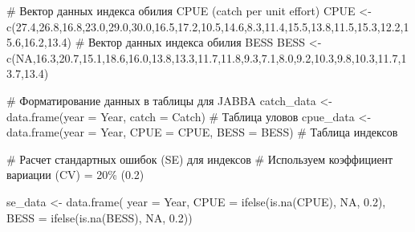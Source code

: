 \documentclass[
  letterpaper,
  DIV=11,
  numbers=noendperiod]{scrreprt}
\newenvironment{Shaded}{\begin{snugshade}}{\end{snugshade}}
\newcommand{\AttributeTok}[1]{\textcolor[rgb]{0.40,0.45,0.13}{#1}}
\newcommand{\CommentTok}[1]{\textcolor[rgb]{0.37,0.37,0.37}{#1}}
\newcommand{\ConstantTok}[1]{\textcolor[rgb]{0.56,0.35,0.01}{#1}}
\newcommand{\FloatTok}[1]{\textcolor[rgb]{0.68,0.00,0.00}{#1}}
\newcommand{\FunctionTok}[1]{\textcolor[rgb]{0.28,0.35,0.67}{#1}}
\newcommand{\NormalTok}[1]{\textcolor[rgb]{0.00,0.23,0.31}{#1}}
\newcommand{\OtherTok}[1]{\textcolor[rgb]{0.00,0.23,0.31}{#1}}
\begin{document}
\begin{Shaded}
\begin{Highlighting}[]
\CommentTok{\# Вектор данных индекса обилия CPUE (catch per unit effort)}
\NormalTok{CPUE }\OtherTok{\textless{}{-}} \FunctionTok{c}\NormalTok{(}\FloatTok{27.4}\NormalTok{,}\FloatTok{26.8}\NormalTok{,}\FloatTok{16.8}\NormalTok{,}\FloatTok{23.0}\NormalTok{,}\FloatTok{29.0}\NormalTok{,}\FloatTok{30.0}\NormalTok{,}\FloatTok{16.5}\NormalTok{,}\FloatTok{17.2}\NormalTok{,}\FloatTok{10.5}\NormalTok{,}\FloatTok{14.6}\NormalTok{,}\FloatTok{8.3}\NormalTok{,}\FloatTok{11.4}\NormalTok{,}\FloatTok{15.5}\NormalTok{,}\FloatTok{13.8}\NormalTok{,}\FloatTok{11.5}\NormalTok{,}\FloatTok{15.3}\NormalTok{,}\FloatTok{12.2}\NormalTok{,}\FloatTok{15.6}\NormalTok{,}\FloatTok{16.2}\NormalTok{,}\FloatTok{13.4}\NormalTok{)}
\CommentTok{\# Вектор данных индекса обилия BESS}
\NormalTok{BESS }\OtherTok{\textless{}{-}} \FunctionTok{c}\NormalTok{(}\ConstantTok{NA}\NormalTok{,}\FloatTok{16.3}\NormalTok{,}\FloatTok{20.7}\NormalTok{,}\FloatTok{15.1}\NormalTok{,}\FloatTok{18.6}\NormalTok{,}\FloatTok{16.0}\NormalTok{,}\FloatTok{13.8}\NormalTok{,}\FloatTok{13.3}\NormalTok{,}\FloatTok{11.7}\NormalTok{,}\FloatTok{11.8}\NormalTok{,}\FloatTok{9.3}\NormalTok{,}\FloatTok{7.1}\NormalTok{,}\FloatTok{8.0}\NormalTok{,}\FloatTok{9.2}\NormalTok{,}\FloatTok{10.3}\NormalTok{,}\FloatTok{9.8}\NormalTok{,}\FloatTok{10.3}\NormalTok{,}\FloatTok{11.7}\NormalTok{,}\FloatTok{13.7}\NormalTok{,}\FloatTok{13.4}\NormalTok{)}

\CommentTok{\# Форматирование данных в таблицы для JABBA}
\NormalTok{catch\_data }\OtherTok{\textless{}{-}} \FunctionTok{data.frame}\NormalTok{(}\AttributeTok{year =}\NormalTok{ Year, }\AttributeTok{catch =}\NormalTok{ Catch) }\CommentTok{\# Таблица уловов}
\NormalTok{cpue\_data }\OtherTok{\textless{}{-}} \FunctionTok{data.frame}\NormalTok{(}\AttributeTok{year =}\NormalTok{ Year, }\AttributeTok{CPUE =}\NormalTok{ CPUE, }\AttributeTok{BESS =}\NormalTok{ BESS) }\CommentTok{\# Таблица индексов}

\CommentTok{\# Расчет стандартных ошибок (SE) для индексов}
\CommentTok{\# Используем коэффициент вариации (CV) = 20\% (0.2)}

\NormalTok{se\_data }\OtherTok{\textless{}{-}} \FunctionTok{data.frame}\NormalTok{(}
 \AttributeTok{year =}\NormalTok{ Year,}
 \AttributeTok{CPUE =} \FunctionTok{ifelse}\NormalTok{(}\FunctionTok{is.na}\NormalTok{(CPUE), }\ConstantTok{NA}\NormalTok{, }\FloatTok{0.2}\NormalTok{),}
 \AttributeTok{BESS =} \FunctionTok{ifelse}\NormalTok{(}\FunctionTok{is.na}\NormalTok{(BESS), }\ConstantTok{NA}\NormalTok{, }\FloatTok{0.2}\NormalTok{))}
\end{Highlighting}
\end{Shaded}
\end{document}
